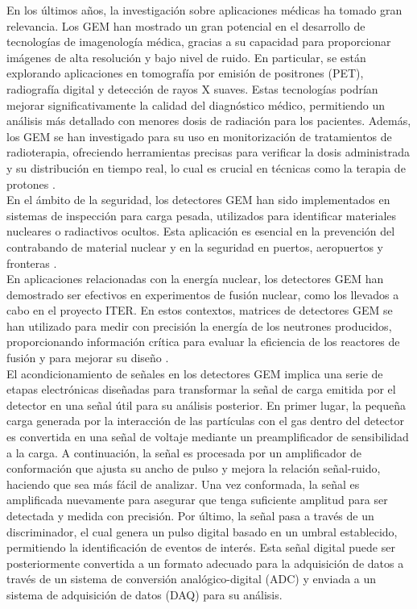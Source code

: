 \documentclass{report}
\begin{document}
\noindent En los últimos años, la investigación sobre aplicaciones médicas ha tomado gran relevancia. Los GEM han mostrado un gran potencial en el desarrollo de tecnologías de imagenología médica, gracias a su capacidad para proporcionar imágenes de alta resolución y bajo nivel de ruido. En particular, se están explorando aplicaciones en tomografía por emisión de positrones (PET), radiografía digital y detección de rayos X suaves. Estas tecnologías podrían mejorar significativamente la calidad del diagnóstico médico, permitiendo un análisis más detallado con menores dosis de radiación para los pacientes. Además, los GEM se han investigado para su uso en monitorización de tratamientos de radioterapia, ofreciendo herramientas precisas para verificar la dosis administrada y su distribución en tiempo real, lo cual es crucial en técnicas como la terapia de protones \cite{tsyganov2008gas} \cite{murtas2014applications}.\\

\noindent En el ámbito de la seguridad, los detectores GEM han sido implementados en sistemas de inspección para carga pesada, utilizados para identificar materiales nucleares o radiactivos ocultos. Esta aplicación es esencial en la prevención del contrabando de material nuclear y en la seguridad en puertos, aeropuertos y fronteras \cite{saenboonruang2015recent}.\\

\noindent En aplicaciones relacionadas con la energía nuclear, los detectores GEM han demostrado ser efectivos en experimentos de fusión nuclear, como los llevados a cabo en el proyecto ITER. En estos contextos, matrices de detectores GEM se han utilizado para medir con precisión la energía de los neutrones producidos, proporcionando información crítica para evaluar la eficiencia de los reactores de fusión y para mejorar su diseño \cite{croci2015gem} \cite{chernyshovaapplication}.\\

\noindent El acondicionamiento de señales en los detectores GEM implica una serie de etapas electrónicas diseñadas para transformar la señal de carga emitida por el detector en una señal útil para su análisis posterior. En primer lugar, la pequeña carga generada por la interacción de las partículas con el gas dentro del detector es convertida en una señal de voltaje mediante un preamplificador de sensibilidad a la carga. A continuación, la señal es procesada por un amplificador de conformación que ajusta su ancho de pulso y mejora la relación señal-ruido, haciendo que sea más fácil de analizar. Una vez conformada, la señal es amplificada nuevamente para asegurar que tenga suficiente amplitud para ser detectada y medida con precisión. Por último, la señal pasa a través de un discriminador, el cual genera un pulso digital basado en un umbral establecido, permitiendo la identificación de eventos de interés. Esta señal digital puede ser posteriormente convertida a un formato adecuado para la adquisición de datos a través de un sistema de conversión analógico-digital (ADC) y enviada a un sistema de adquisición de datos (DAQ) para su análisis.
\newpage
\end{document}
